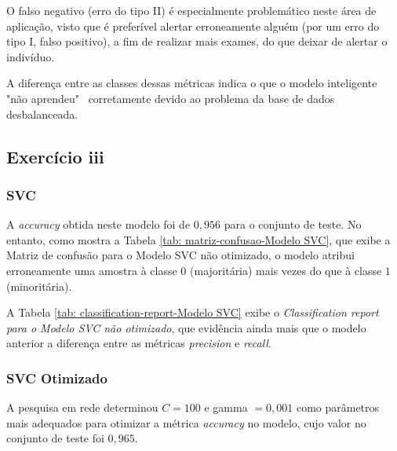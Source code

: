 O falso negativo (erro do tipo II) é especialmente problemático neste área de aplicação, visto que é preferível alertar erroneamente alguém (por um erro do tipo I, falso positivo), a fim de realizar mais exames, do que deixar de alertar o indivíduo.

A diferença entre as classes dessas métricas indica o que o modelo inteligente "não aprendeu" \ corretamente devido ao problema da base de dados desbalanceada.

\subsection{Exercício iii}


% 


\subsubsection{SVC}

A \textit{accuracy} obtida neste modelo foi de $0,956$ para o conjunto de teste. No entanto, como mostra a Tabela \ref{tab: matriz-confusao-Modelo SVC}, que exibe a Matriz de confusão para o Modelo SVC não otimizado, o modelo atribui erroneamente uma amostra à classe $0$ (majoritária) mais vezes do que à classe $1$ (minoritária).



A Tabela \ref{tab: classification-report-Modelo SVC} exibe o \textit{Classification report para o Modelo SVC não otimizado}, que evidência ainda mais que o modelo anterior a diferença entre as métricas \textit{precision} e \textit{recall}.



\subsubsection{SVC Otimizado}

A pesquisa em rede determinou $C = 100$ e gamma $ = 0,001$ como parâmetros mais adequados para otimizar a métrica \textit{accuracy} no modelo, cujo valor no conjunto de teste foi $0,965$. 

